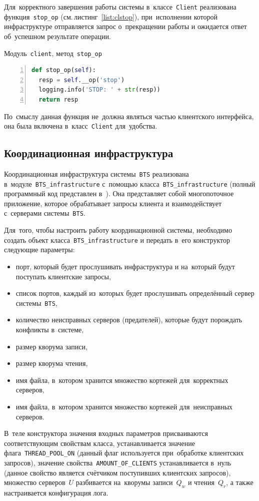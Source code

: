 Для~корректного завершения работы системы в~классе~\texttt{Client} реализована функция~\texttt{stop_op} (см.\,листинг~\ref{list:clstop}), при~исполнении которой инфраструктуре отправляется запрос о~прекращении работы и ожидается ответ об~успешном результате операции.
\begin{ListingEnv}\caption{Модуль~\texttt{client}, метод~\texttt{stop_op}}\label{list:clstop}
	\begin{lstlisting}[language=Python, numbers=left]
def stop_op(self):
  resp = self.__op('stop')
  logging.info('STOP: ' + str(resp))
  return resp
	\end{lstlisting}
\end{ListingEnv}
По~смыслу данная функция не~должна являться частью клиентского интерфейса, она была включена в~класс~\texttt{Client} для~удобства.


\subsection{Координационная инфраструктура}\label{subsec:4}
Координационная инфраструктура системы~\texttt{BTS} реализована в~модуле~\texttt{BTS_infrastructure} с~помощью класса~\texttt{BTS_infrastructure} (полный программный код представлен в~\autocite{mybts}). Она представляет собой многопоточное приложение, которое обрабатывает запросы клиента и взаимодействует с~серверами системы~\texttt{BTS}.

Для~того, чтобы настроить работу координационной системы, необходимо создать объект класса~\texttt{BTS_infrastructure} и передать в~его конструктор следующие параметры:
\begin{itemize}
	\item порт, который будет прослушивать инфраструктура и на~который будут поступать клиентские запросы,
	\item список портов, каждый из~которых будет прослушивать определённый сервер системы~\texttt{BTS},
	\item количество неисправных серверов (предателей), которые будут порождать конфликты в~системе,
	\item размер кворума записи,
	\item размер кворума чтения,
	\item имя файла, в~котором хранится множество кортежей для~корректных серверов,
	\item имя файла, в~котором хранится множество кортежей для~неисправных серверов.
\end{itemize}
В~теле конструктора значения входных параметров присваиваются соответствующим свойствам класса, устанавливается значение флага~\texttt{THREAD_POOL_ON} (данный флаг используется при~обработке клиентских запросов), значение свойства~\texttt{AMOUNT_OF_CLIENTS} устанавливается в~нуль (данное свойство является счётчиком поступивших клиентских запросов), множество серверов~$U$ разбивается на~кворумы записи~$Q_w$ и чтения~$Q_r$, а также настраивается конфигурация лога.

